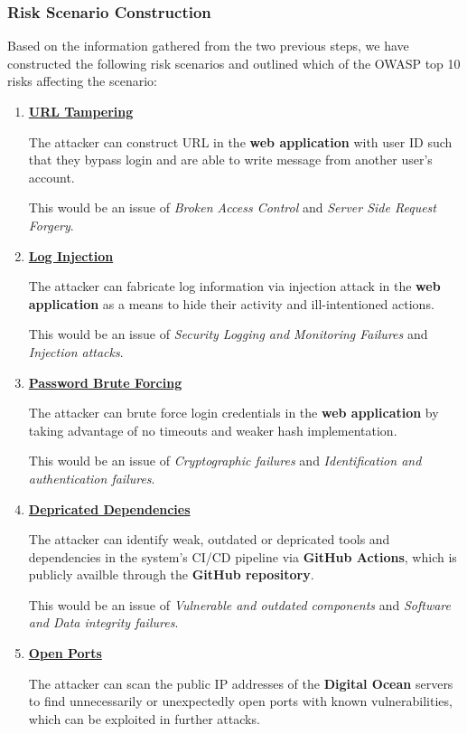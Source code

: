 \subsubsection{Risk Scenario Construction}
Based on the information gathered from the two previous steps, we have constructed the following risk scenarios and outlined which of the OWASP top 10 risks affecting the scenario:
\begin{enumerate}
    \item \textbf{\underline{URL Tampering}}

    The attacker can construct URL in the \textbf{web application} with user ID such that they bypass login and are able to write message from another user’s account.

    This would be an issue of \textit{Broken Access Control} and \textit{Server Side Request Forgery}.
    \item \textbf{\underline{Log Injection}}

    The attacker can fabricate log information via injection attack in the \textbf{web application} as a means to hide their activity and ill-intentioned actions.

    This would be an issue of \textit{Security Logging and Monitoring Failures} and \textit{Injection attacks}.
    \item \textbf{\underline{Password Brute Forcing}}

    The attacker can brute force login credentials in the \textbf{web application} by taking advantage of no timeouts and weaker hash implementation.

    This would be an issue of \textit{Cryptographic failures} and \textit{Identification and authentication failures}.
    \item \textbf{\underline{Depricated Dependencies}}

    The attacker can identify weak, outdated or depricated tools and dependencies in the system's CI/CD pipeline via \textbf{GitHub Actions}, which is publicly availble through the \textbf{GitHub repository}.

    This would be an issue of \textit{Vulnerable and outdated components} and \textit{Software and Data integrity failures}.
    \item \textbf{\underline{Open Ports}}

    The attacker can scan the public IP addresses of the \textbf{Digital Ocean} servers to find unnecessarily or unexpectedly open ports with known vulnerabilities, which can be exploited in further attacks.


\end{enumerate}
